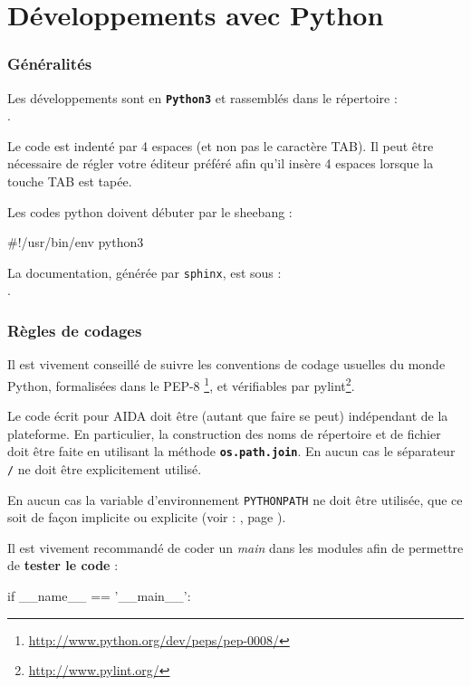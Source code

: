 \part{Développements avec Python}
\label{part:dev_Python}

\section{Généralités}
Les développements sont en \textbf{\texttt{Python3}} et rassemblés dans le
répertoire : \\
\-\hspace{1cm} .
\smallbreak

  Le code est indenté par 4 espaces (et non pas le caractère TAB). Il peut être
nécessaire de régler votre éditeur préféré afin qu'il insère 4 espaces lorsque
la touche TAB est tapée.
\smallbreak

  Les codes python doivent débuter par le sheebang :
\begin{boxedverbatim}
#!/usr/bin/env python3
\end{boxedverbatim}
\smallbreak

La documentation, générée par \texttt{sphinx}, est sous : \\
\-\hspace{1cm} .

\section{Règles de codages}
   Il est vivement conseillé de suivre les conventions de codage usuelles du
monde Python, formalisées dans le PEP-8
\footnote{\url{http://www.python.org/dev/peps/pep-0008/}},
et vérifiables par pylint\footnote{\url{http://www.pylint.org/}}.
\smallbreak

  Le code écrit pour AIDA doit être (autant que faire se peut) indépendant de
la plateforme. En particulier, la construction des noms de répertoire et de
fichier doit être faite en utilisant la méthode \textbf{\texttt{os.path.join}}.
En aucun cas le séparateur \texttt{/} ne doit être explicitement utilisé.
\smallbreak

  En aucun cas la variable d'environnement \texttt{PYTHONPATH} ne doit être
utilisée, que ce soit de façon implicite ou explicite
(voir : , page \pageref{sec:import_AIDA}). \\
\smallbreak

Il est vivement recommandé de coder un \textit{main} dans les modules afin de
permettre de \textbf{tester le code} :
\begin{boxedverbatim}
if __name__ == '__main__':
\end{boxedverbatim}


